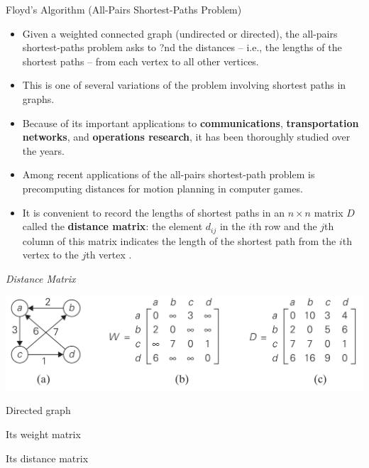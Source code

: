 \documentclass[english,t]{beamer}
\begin{document}
\begin{frame}{Floyd's Algorithm (All-Pairs Shortest-Paths Problem)}
	\begin{itemize}
		\item<2-> Given a weighted connected graph (undirected or directed), the all-pairs shortest-paths problem asks to ?nd the distances -- i.e., the lengths of the shortest paths -- from each vertex to all other vertices.
		\item<3-> This is one of several variations of the problem involving shortest paths in graphs.
		\item<4-> Because of its important applications to \textbf{communications}, \textbf{transportation networks}, and \textbf{operations research}, it has been thoroughly studied over the years. 
		\item<5-> Among recent applications of the all-pairs shortest-path problem is precomputing distances for motion planning in computer games. 
		\item<6-> It is convenient to record the lengths of shortest paths in an $n \times n$ matrix $D$ called the \textbf{distance matrix}: the element $d_{ij}$ in the $i$th row and the $j$th column of this matrix indicates the length of the shortest path from the $i$th vertex to the $j$th vertex \citep{levitin2012introduction}.		
	\end{itemize}	
\end{frame}

\begin{frame}{\textit{Distance Matrix}}
	\begin{center}
		\includegraphics[scale=.185]{images/distance-matrix}
	\end{center}
	\begin{description}
	\item<2->[(a)] Directed graph
	\item<3->[(b)] Its weight matrix
	\item<4->[(c)] Its distance matrix
	\end{description}		
\end{frame}
\end{document}
